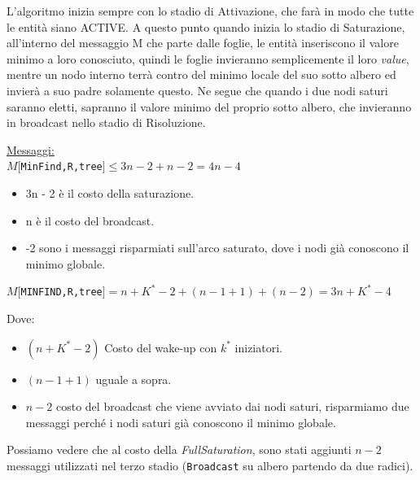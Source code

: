 L'algoritmo inizia sempre con lo stadio di Attivazione, che farà in modo che
tutte le entità siano ACTIVE. A questo punto quando inizia lo stadio di
Saturazione, all'interno del messaggio M che parte dalle foglie, le entità
inseriscono il valore minimo a loro conosciuto, quindi le foglie invieranno
semplicemente il loro \textit{value}, mentre un nodo interno terrà contro del minimo locale
del suo sotto albero ed invierà a suo padre solamente questo. Ne segue che
quando i due nodi saturi saranno eletti, sapranno il valore minimo del proprio
sotto albero, che invieranno in broadcast nello stadio di Risoluzione.


\underline{Messaggi:}\\
$M[$\texttt{MinFind,R,tree}$] \leq 3n - 2 + n - 2 = 4n - 4$
\begin{itemize}
    \item 3n - 2 è il costo della saturazione.
    \item n è il costo del broadcast.
    \item -2 sono i messaggi risparmiati sull'arco saturato, dove i nodi già
          conoscono il minimo globale.
\end{itemize}

\begin{center}
    $M[$\texttt{MINFIND,R,tree}$] = n + K^* - 2 + (n-1+1) + (n-2) = 3n + K^* -
        4$\\
\end{center}
Dove:
\begin{itemize}
    \item $(n + K^* - 2)$ Costo del wake-up con $k^*$ iniziatori.
    \item $(n-1+1)$ uguale a sopra.
    \item $n-2$ costo del broadcast che viene avviato dai nodi saturi, risparmiamo
          due messaggi perché i nodi saturi già conoscono il minimo globale.
\end{itemize}
Possiamo vedere che al costo della \textit{FullSaturation}, sono stati aggiunti
$n-2$ messaggi utilizzati nel terzo stadio (\texttt{Broadcast} su albero
partendo da due radici).


